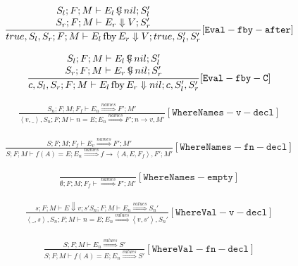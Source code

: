 \documentclass{scrartcl}
\DeclareMathOperator{\fby}{fby}
\DeclareMathOperator{\ceval}{\overset{C}{\smash{\Downarrow}}}
\begin{document}
    \begin{align*}
    \frac{
        \begin{matrix}
        S_l; F; M \vdash E_l  \ceval nil; S_l' \\
        S_r; F; M \vdash E_r \Downarrow V; S_r'
        \end{matrix}
    }{
        true, S_l, S_r; F; M \vdash E_l \fby E_r \Downarrow V; true, S_l', S_r'
    }[\mathtt{Eval-fby-after}]
    \end{align*}
    
    \begin{align*}
    \frac{
        \begin{matrix}
        S_l; F; M \vdash E_l  \ceval nil; S_l' \\
        S_r; F; M \vdash E_r  \ceval nil; S_r'
        \end{matrix}
    }{
        c, S_l, S_r; F; M \vdash E_l \fby E_r \Downarrow nil; c, S_l', S_r'
    }[\mathtt{Eval-fby-C}]
    \end{align*}
    
    \begin{align*}
    \frac{
        S_n; F; M; F_f \vdash E_n \overset{names}{\Rightarrow} F'; M'
    }{
        \left<v, \_ \right>, S_n; F; M \vdash n = E; E_n \overset{names}{\Rightarrow} F'; n \to v, M'
    }[\mathtt{WhereNames-v-decl}]
    \end{align*}
    
    \begin{align*}
    \frac{
        S; F; M; F_f \vdash E_v \overset{names}{\Rightarrow} F'; M'
    }{
        S; F; M \vdash f(A) = E; E_n \overset{names}{\Rightarrow} f \to \left< A, E, F_f \right >, F'; M'
    }[\mathtt{WhereNames-fn-decl}]
    \end{align*}
    
    \begin{align*}
    \frac{}{
        \emptyset; F; M; F_f \vdash \overset{names}{\Rightarrow} F'; M'
    }[\mathtt{WhereNames-empty}]
    \end{align*}
    
    \begin{align*}
    \frac{
        s; F; M \vdash E \Downarrow v; s'
        S_n; F; M \vdash E_n \overset{values}{\Rightarrow} S_n'
    }{
        \left<\_, s\right>, S_n; F; M \vdash n = E; E_n \overset{values}{\Rightarrow} \left<v, s'\right>, S_n'
    }[\mathtt{WhereVal-v-decl}]
    \end{align*}
    
    \begin{align*}
    \frac{
        S; F; M \vdash E_n \overset{values}{\Rightarrow} S'
    }{
        S; F; M \vdash f(A) = E; E_n \overset{values}{\Rightarrow} S'
    }[\mathtt{WhereVal-fn-decl}]
    \end{align*}
    
\end{document}
